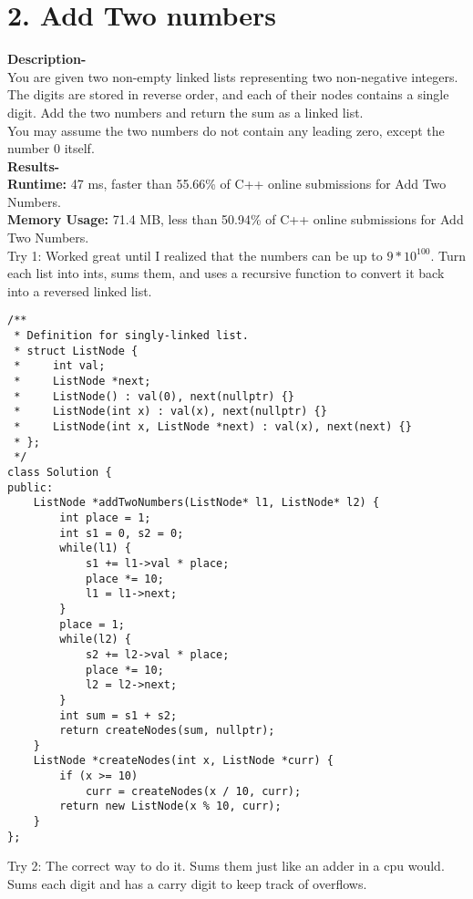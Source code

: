 \chapter{2. Add Two numbers}
\textbf{Description-}\\
You are given two non-empty linked lists representing two non-negative integers. The digits are stored in reverse order, and each of their nodes contains a single digit. Add the two numbers and return the sum as a linked list.
\\
You may assume the two numbers do not contain any leading zero, except the number 0 itself.\\
\textbf{Results-}\\
\textbf{Runtime:} 47 ms, faster than 55.66\% of C++ online submissions for Add Two Numbers.\\
\textbf{Memory Usage:} 71.4 MB, less than 50.94\% of C++ online submissions for Add Two Numbers.\\
\newpage
Try 1: Worked great until I realized that the numbers can be up to $9*10^{100}$. Turn each list into
ints, sums them, and uses a recursive function to convert it back into a reversed linked list.\\
\begin{lstlisting}
/**
 * Definition for singly-linked list.
 * struct ListNode {
 *     int val;
 *     ListNode *next;
 *     ListNode() : val(0), next(nullptr) {}
 *     ListNode(int x) : val(x), next(nullptr) {}
 *     ListNode(int x, ListNode *next) : val(x), next(next) {}
 * };
 */
class Solution {
public:
    ListNode *addTwoNumbers(ListNode* l1, ListNode* l2) {
        int place = 1;
        int s1 = 0, s2 = 0;
        while(l1) {
            s1 += l1->val * place;
            place *= 10;
            l1 = l1->next;
        }
        place = 1;
        while(l2) {
            s2 += l2->val * place;
            place *= 10;
            l2 = l2->next;
        }
        int sum = s1 + s2;
        return createNodes(sum, nullptr);
    }
    ListNode *createNodes(int x, ListNode *curr) {
        if (x >= 10) 
            curr = createNodes(x / 10, curr);
        return new ListNode(x % 10, curr);
    }
};
\end{lstlisting}
\newpage
Try 2: The correct way to do it. Sums them just like an adder in a cpu would. Sums each digit and has a carry digit to keep track of overflows.
